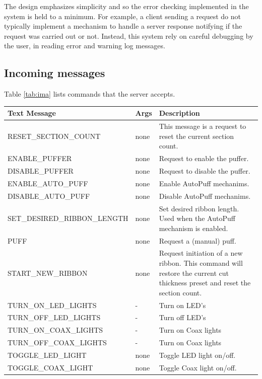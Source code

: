 \documentclass[11pt,fleqn]{book} %
\begin{document}
The design emphasizes simplicity and so the error checking implemented in the system is held to a minimum. For example, a client sending a request do not typically implement a mechanism to handle a server response notifying if the request was carried out or not.
Instead, this system rely on careful debugging by the user, in reading error and warning log messages.


\subsection{Incoming messages}

Table \ref{tab:ima} lists commands that the \ar{} server accepts.
\begin{table}[h]
\centering
\begin{tabular}{l l  p{180pt}}
\toprule
\textbf{Text Message} & \textbf{Args} & \textbf{Description} \\
\midrule
RESET\_SECTION\_COUNT 	        & none & This message is a request to reset the current section count. \\
ENABLE\_PUFFER                  & none & Request to enable the puffer. \\  
DISABLE\_PUFFER                 & none & Request to disable the puffer. \\  
ENABLE\_AUTO\_PUFF              & none & Enable AutoPuff mechanims. \\  
DISABLE\_AUTO\_PUFF             & none & Disable AutoPuff mechanims. \\  
SET\_DESIRED\_RIBBON\_LENGTH    & none & Set desired ribbon length. Used when the AutoPuff mechanism is enabled. \\  
PUFF                            & none & Request a (manual) puff. \\  
START\_NEW\_RIBBON              & none & Request initiation of a new ribbon. This command will restore the current cut thickness preset and reset the section count. \\  
TURN\_ON\_LED\_LIGHTS				& -		& Turn on LED's \\
TURN\_OFF\_LED\_LIGHTS				& -		& Turn off LED's \\
TURN\_ON\_COAX\_LIGHTS				& -		& Turn on Coax lights \\
TURN\_OFF\_COAX\_LIGHTS			& -		& Turn on Coax lights \\
TOGGLE\_LED\_LIGHT              & none & Toggle LED light on/off. \\  
TOGGLE\_COAX\_LIGHT             & none & Toggle Coax light on/off. \\  


\end{tabular}
\end{table}
\end{document}

